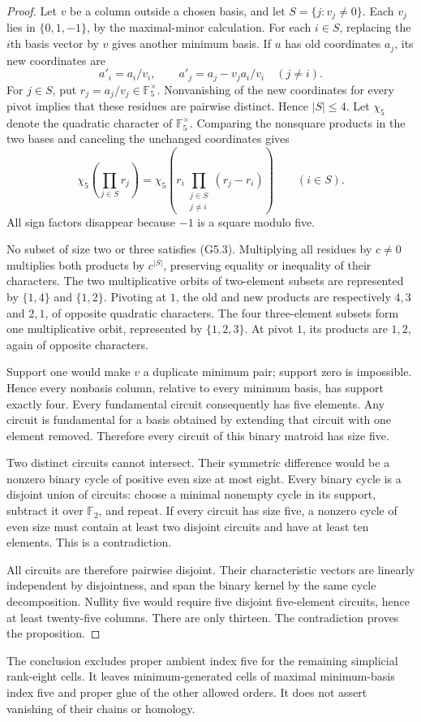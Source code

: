 \begin{proof}
Let \(v\) be a column outside a chosen basis, and let
\(S=\{j:v_j\ne0\}\).  Each \(v_j\) lies in \(\{0,1,-1\}\),
by the maximal-minor calculation.  For each \(i\in S\),
replacing the \(i\)th basis vector by \(v\) gives another
minimum basis.  If \(u\) has old coordinates \(a_j\), its
new coordinates are
\[
 a'_i=a_i/v_i,\qquad
 a'_j=a_j-v_j a_i/v_i\quad(j\ne i).
                                                               \tag{G5.2}
\]
For \(j\in S\), put \(r_j=a_j/v_j\in\mathbb F_5^\times\).
Nonvanishing of the new coordinates for every pivot implies
that these residues are pairwise distinct.  Hence \(|S|\le4\).
Let \(\chi_5\) denote the quadratic character of
\(\mathbb F_5^\times\).
Comparing the nonsquare products in the two bases and
canceling the unchanged coordinates gives
\[
 \chi_5\left(\prod_{j\in S}r_j\right)
 =
 \chi_5\left(r_i\prod_{\substack{j\in S\\j\ne i}}(r_j-r_i)\right)
 \qquad(i\in S).                                             \tag{G5.3}
\]
All sign factors disappear because \(-1\) is a square
modulo five.

No subset of size two or three satisfies (G5.3).
Multiplying all residues by \(c\ne0\) multiplies both
products by \(c^{|S|}\), preserving equality or inequality
of their characters.  The two multiplicative orbits of
two-element subsets are represented by \(\{1,4\}\) and
\(\{1,2\}\).  Pivoting at \(1\), the old and new products
are respectively \(4,3\) and \(2,1\), of opposite quadratic
characters.  The four three-element subsets form one
multiplicative orbit, represented by \(\{1,2,3\}\).
At pivot \(1\), its products are \(1,2\), again of opposite
characters.

Support one would make \(v\) a duplicate minimum pair;
support zero is impossible.  Hence every nonbasis column,
relative to every minimum basis, has support exactly four.
Every fundamental circuit consequently has five elements.
Any circuit is fundamental for a basis obtained by extending
that circuit with one element removed.  Therefore every
circuit of this binary matroid has size five.

Two distinct circuits cannot intersect.  Their symmetric
difference would be a nonzero binary cycle of positive even
size at most eight.  Every binary cycle is a disjoint union
of circuits: choose a minimal nonempty cycle in its support,
subtract it over \(\mathbb F_2\), and repeat.
If every circuit has size five, a nonzero cycle of even size
must contain at least two disjoint circuits and have at
least ten elements.  This is a contradiction.

All circuits are therefore pairwise disjoint.  Their
characteristic vectors are linearly independent by
disjointness, and span the binary kernel by the same
cycle decomposition.  Nullity five would require five
disjoint five-element circuits, hence at least twenty-five
columns.  There are only thirteen.  The contradiction
proves the proposition.
\end{proof}

The conclusion excludes proper ambient index five for the
remaining simplicial rank-eight cells.  It leaves
minimum-generated cells of maximal minimum-basis index five
and proper glue of the other allowed orders.  It does not
assert vanishing of their chains or homology.
